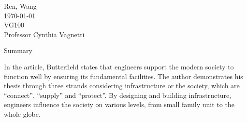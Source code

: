 \documentclass[12pt,a4]{article}
\begin{document}
\begin{flushleft}
Ren, Wang\\
\today\\
VG100\\
Professor Cynthia Vagnetti \\
\end{flushleft}

\begin{center}
Summary
\end{center}


In the article, Butterfield \cite{but} states that engineers support the modern
society to function well by ensuring its fundamental facilities. 
The author demonstrates his thesis through three strands considering
infrastructure or the society, which are ``connect'', ``supply'' and
``protect''. 
By designing and building infrastructure, engineers influence the society on
various levels, from small family unit to the whole globe.  




\end{document}
